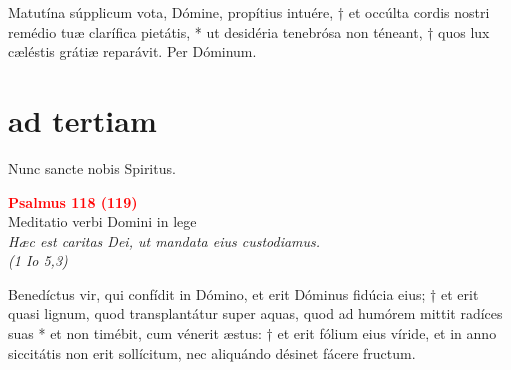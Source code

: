 
\vspace{0.6cm}

\def\greinitialformat#1{{\fontsize{40}{40}\selectfont #1}}
\gresetfirstlineaboveinitial{\small \textcolor{red}{Benedic.}}{}
\setaboveinitialseparation{0.72mm}


Matutína súpplicum vota, Dómine, propítius intuére, † et occúlta cordis nostri remédio tuæ clarífica pietátis, * 
ut desidéria tenebrósa non téneant, † quos lux cæléstis grátiæ reparávit. Per Dóminum.\\


\section[horae minores]{ad tertiam}

 Nunc sancte nobis Spiritus.

\begin{center}
 \textcolor{red}{\large \bf Psalmus 118 (119)}\\
Meditatio verbi Domini in lege\\
\textit{\small Hæc est caritas Dei, ut mandata eius custodiamus.\\(1 Io 5,3)}
\end{center}

\def\greinitialformat#1{{\fontsize{40}{40}\selectfont #1}}
\gresetfirstlineaboveinitial{\small \textcolor{red}{ xx - xxii }}{}
\setaboveinitialseparation{0.72mm}



\vspace{0.3cm}
Benedíctus vir, qui confídit in Dómino, et erit Dóminus fidúcia eius; † et erit quasi lignum, quod transplantátur super aquas, quod ad humórem mittit radíces suas * 
et non timébit, cum vénerit æstus: † et erit fólium eius víride, et in anno siccitátis non erit sollícitum, nec aliquándo désinet fácere fructum.\\


